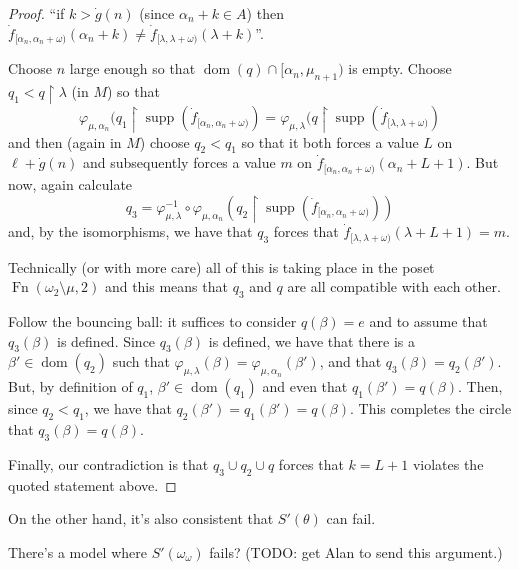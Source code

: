 \documentclass[11pt]{article}
\begin{document}
\begin{proof}
        \centerline{
         ``if $k>\dot g(n)$ (since  $\alpha_n+k\in A$) then
         $\dot f_{[\alpha_n,\alpha_n+\omega)}(\alpha_n+k) \neq
        \dot f_{[\lambda,\lambda+\omega)}(\lambda +k)$''.}

        Choose $n$ large enough so that $\mathop{dom}(q) \cap [\alpha_n,
        \mu_{n+1})$ is
        empty.
         Choose $q_1<q\restriction \lambda$ (in $M$) so that
        $$ \varphi_{\mu,\alpha_n}(q_1\restriction \operatorname{supp}(
         \dot f_{[\alpha_n,\alpha_n+\omega)}) =
        \varphi_{\mu,\lambda}(q\restriction \operatorname{supp}(
         \dot f_{[\lambda,\lambda+\omega)}) $$
        and then (again in $M$) choose $q_2 < q_1$
        so that it both forces a value
         $L$ on $\ell+\dot g(n)$
        and subsequently forces a value $m$ on
         $\dot f_{[\alpha_n, \alpha_n+\omega)}(\alpha_n+L+1)$.
        But now, again calculate
        $$ q_3 = \varphi_{\mu,\lambda}^{-1} \circ \varphi_{\mu,\alpha_n}
        (q_2\restriction \operatorname{supp}(\dot
        f_{[\alpha_n,\alpha_n+\omega)}))$$
        and, by the isomorphisms, we have that $q_3$ forces that
         $\dot f_{[\lambda,\lambda+\omega)}(\lambda+L+1) = m$.

        Technically (or with more care)  all of this is taking place in the
        poset $\operatorname{Fn}(\omega_2\setminus \mu,2)$ and this means
        that $q_3$ and $q$ are all compatible with each other.


        Follow
        the bouncing ball: it suffices to consider
         $q(\beta)=e$ and to assume that $q_3(\beta)$ is defined.
        Since $q_3(\beta)$ is defined, we have that
        there is a  $\beta'\in\mathop{dom}(q_2)$ such that $
         \varphi_{\mu,\lambda}(\beta) = \varphi_{\mu,\alpha_n}(\beta')$,
        and that $q_3(\beta) = q_2(\beta')$.
        But, by definition of $q_1$, $\beta'\in\mathop{dom}(q_1)$
        and even  that $q_1(\beta') = q(\beta)$.
         Then, since $q_2<q_1$, we have that $q_2(\beta')=q_1(\beta') =
         q(\beta)$. This completes the circle that $q_3(\beta) = q(\beta)$.
        \bigskip

        Finally, our contradiction is that $q_3\cup q_2\cup q$
        forces that
         $k=L+1$ violates the quoted statement above.
        \end{proof}

  On the other hand, it's also consistent that \(S'(\theta)\) can fail.

  \begin{theorem}
    There's a model where \(S'(\omega_\omega)\)
    fails? (TODO: get Alan to send this argument.)
  \end{theorem}
\end{document}
